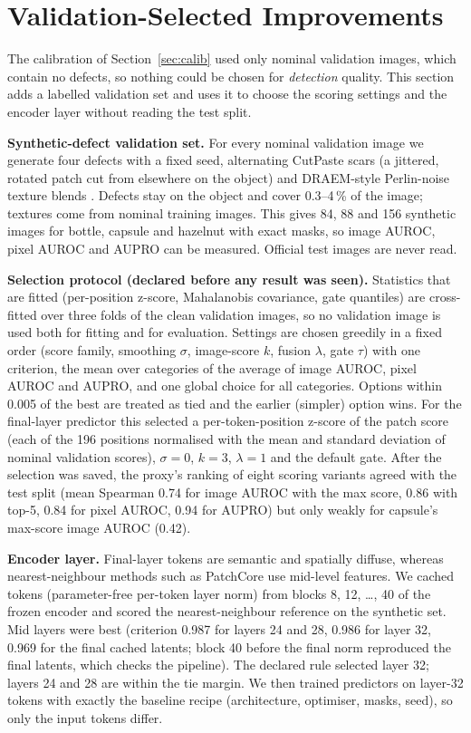 \documentclass[conference]{IEEEtran}
\begin{document}
\section{Validation-Selected Improvements}\label{sec:improve}
The calibration of Section~\ref{sec:calib} used only nominal validation images, which contain no defects, so nothing could be chosen for \emph{detection} quality. This section adds a labelled validation set and uses it to choose the scoring settings and the encoder layer without reading the test split.

\textbf{Synthetic-defect validation set.} For every nominal validation image we generate four defects with a fixed seed, alternating CutPaste scars \cite{li2021cutpaste} (a jittered, rotated patch cut from elsewhere on the object) and DRAEM-style Perlin-noise texture blends \cite{zavrtanik2021draem}. Defects stay on the object and cover 0.3--4\,\% of the image; textures come from nominal training images. This gives 84, 88 and 156 synthetic images for bottle, capsule and hazelnut with exact masks, so image AUROC, pixel AUROC and AUPRO can be measured. Official test images are never read.

\textbf{Selection protocol (declared before any result was seen).} Statistics that are fitted (per-position z-score, Mahalanobis covariance, gate quantiles) are cross-fitted over three folds of the clean validation images, so no validation image is used both for fitting and for evaluation. Settings are chosen greedily in a fixed order (score family, smoothing $\sigma$, image-score $k$, fusion $\lambda$, gate $\tau$) with one criterion, the mean over categories of the average of image AUROC, pixel AUROC and AUPRO, and one global choice for all categories. Options within 0.005 of the best are treated as tied and the earlier (simpler) option wins. For the final-layer predictor this selected a per-token-position z-score of the patch score (each of the 196 positions normalised with the mean and standard deviation of nominal validation scores), $\sigma{=}0$, $k{=}3$, $\lambda{=}1$ and the default gate. After the selection was saved, the proxy's ranking of eight scoring variants agreed with the test split (mean Spearman 0.74 for image AUROC with the max score, 0.86 with top-5, 0.84 for pixel AUROC, 0.94 for AUPRO) but only weakly for capsule's max-score image AUROC (0.42).

\textbf{Encoder layer.} Final-layer tokens are semantic and spatially diffuse, whereas nearest-neighbour methods such as PatchCore use mid-level features. We cached tokens (parameter-free per-token layer norm) from blocks 8, 12, \dots, 40 of the frozen encoder and scored the nearest-neighbour reference on the synthetic set. Mid layers were best (criterion 0.987 for layers 24 and 28, 0.986 for layer 32, 0.969 for the final cached latents; block 40 before the final norm reproduced the final latents, which checks the pipeline). The declared rule selected layer 32; layers 24 and 28 are within the tie margin. We then trained predictors on layer-32 tokens with exactly the baseline recipe (architecture, optimiser, masks, seed), so only the input tokens differ.
\end{document}
